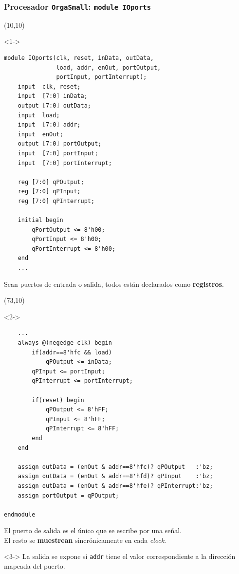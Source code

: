 \documentclass[aspectratio=169]{beamer}
\begin{document}
\begin{frame}[fragile,t]
    \frametitle{Procesador \texttt{OrgaSmall}: \texttt{module IOports}}
    \begin{textblock}{58}(10,10)
    \begin{onlyenv}<1->
\lstset{basicstyle=\tiny}
\begin{lstlisting}
module IOports(clk, reset, inData, outData, 
               load, addr, enOut, portOutput,
               portInput, portInterrupt);
    input  clk, reset;
    input  [7:0] inData;
    output [7:0] outData;
    input  load;
    input  [7:0] addr;
    input  enOut;
    output [7:0] portOutput;
    input  [7:0] portInput;
    input  [7:0] portInterrupt;
    
    reg [7:0] qPOutput;
    reg [7:0] qPInput;
    reg [7:0] qPInterrupt;
    
    initial begin
        qPortOutput <= 8'h00;
        qPortInput <= 8'h00;
        qPortInterrupt <= 8'h00;   
    end
    ...
\end{lstlisting}
    \small
    Sean puertos de entrada o salida, todos están declarados como \textbf{registros}.
    \end{onlyenv}
    \end{textblock}
    \begin{textblock}{78}(73,10)
    \begin{onlyenv}<2->
\lstset{basicstyle=\tiny}
\begin{lstlisting}
    ...
    always @(negedge clk) begin
        if(addr==8'hfc && load)
            qPOutput <= inData;
        qPInput <= portInput;
        qPInterrupt <= portInterrupt;
        
        if(reset) begin
            qPOutput <= 8'hFF;
            qPInput <= 8'hFF;
            qPInterrupt <= 8'hFF;
        end
    end

    assign outData = (enOut & addr==8'hfc)? qPOutput   :'bz;
    assign outData = (enOut & addr==8'hfd)? qPInput    :'bz;
    assign outData = (enOut & addr==8'hfe)? qPInterrupt:'bz;
    assign portOutput = qPOutput;
    
endmodule
\end{lstlisting}
    \small
    El puerto de salida es el único que se escribe por una señal.\\
    El resto se \textbf{muestrean} sincrónicamente en cada \emph{clock}.\\
    \end{onlyenv}
    \begin{onlyenv}<3->
    \textcolor{verdeuca}{La salida se expone si \texttt{addr} tiene el valor correspondiente a la dirección mapeada del puerto.}
    \end{onlyenv}
    \end{textblock}
\end{frame}
\end{document}

